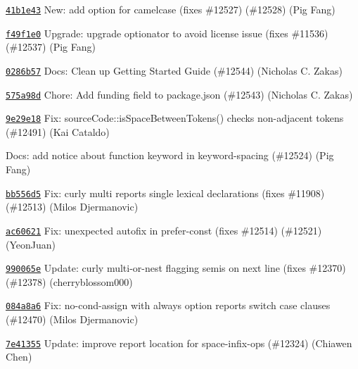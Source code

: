 \begin{DoxyItemize}
\item \href{https://github.com/eslint/eslint/commit/41b1e4308c1cb01c8b00cc8adc36440e77854117}{\texttt{ {\ttfamily 41b1e43}}} New\+: add option for camelcase (fixes \#12527) (\#12528) (Pig Fang)
\item \href{https://github.com/eslint/eslint/commit/f49f1e0a69afa49f6548af7b2c0e6347e1ea022d}{\texttt{ {\ttfamily f49f1e0}}} Upgrade\+: upgrade optionator to avoid license issue (fixes \#11536) (\#12537) (Pig Fang)
\item \href{https://github.com/eslint/eslint/commit/0286b5730501b391c74e069db46849f0de0885d2}{\texttt{ {\ttfamily 0286b57}}} Docs\+: Clean up Getting Started Guide (\#12544) (Nicholas C. Zakas)
\item \href{https://github.com/eslint/eslint/commit/575a98d724b2688f1e9c83744c5dc9ffe9a7bfb4}{\texttt{ {\ttfamily 575a98d}}} Chore\+: Add funding field to package.\+json (\#12543) (Nicholas C. Zakas)
\item \href{https://github.com/eslint/eslint/commit/9e29e189752f06362fd1956659e07834efb746a5}{\texttt{ {\ttfamily 9e29e18}}} Fix\+: source\+Code\+::is\+Space\+Between\+Tokens() checks non-\/adjacent tokens (\#12491) (Kai Cataldo)
\item \href{https://github.com/eslint/eslint/commit/586855060afb3201f4752be8820dc85703b523a6}{\texttt{ {}}} Docs\+: add notice about {\ttfamily function} keyword in keyword-\/spacing (\#12524) (Pig Fang)
\item \href{https://github.com/eslint/eslint/commit/bb556d5fd735ad2dcea322082edcc07a58105ce9}{\texttt{ {\ttfamily bb556d5}}} Fix\+: curly {\ttfamily multi} reports single lexical declarations (fixes \#11908) (\#12513) (Milos Djermanovic)
\item \href{https://github.com/eslint/eslint/commit/ac606217d4beebc35b865d14a7f9723fd21faa48}{\texttt{ {\ttfamily ac60621}}} Fix\+: unexpected autofix in prefer-\/const (fixes \#12514) (\#12521) (Yeon\+Juan)
\item \href{https://github.com/eslint/eslint/commit/990065e5f58b6cc6922ab6cee5b97bfc56a6237a}{\texttt{ {\ttfamily 990065e}}} Update\+: curly multi-\/or-\/nest flagging semis on next line (fixes \#12370) (\#12378) (cherryblossom000)
\item \href{https://github.com/eslint/eslint/commit/084a8a63a749232681fefe9bdac6802efdcdc8a8}{\texttt{ {\ttfamily 084a8a6}}} Fix\+: no-\/cond-\/assign with {\ttfamily always} option reports switch case clauses (\#12470) (Milos Djermanovic)
\item \href{https://github.com/eslint/eslint/commit/7e41355b19a8ef347620dd7c0dde491c3460937b}{\texttt{ {\ttfamily 7e41355}}} Update\+: improve report location for space-\/infix-\/ops (\#12324) (Chiawen Chen)

\end{DoxyItemize}
